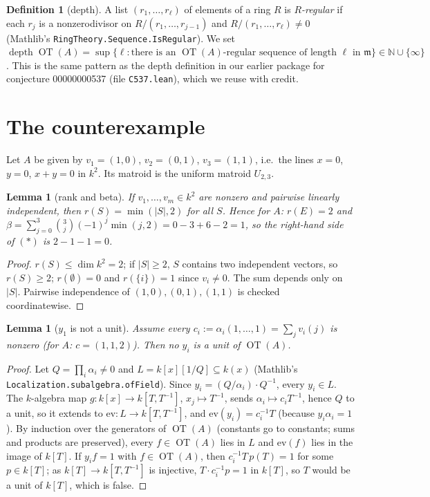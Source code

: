 \documentclass[11pt]{article}
\newtheorem{lemma}[theorem]{Lemma}
\theoremstyle{definition}
\newtheorem{definition}[theorem]{Definition}
\theoremstyle{remark}
\newcommand{\OT}{\operatorname{OT}}
\newcommand{\rk}{r}
\newcommand{\depth}{\operatorname{depth}}
\begin{document}
\begin{definition}[depth]
A list $(r_1,\dots,r_\ell)$ of elements of a ring $R$ is \emph{$R$-regular} if each $r_j$ is a
nonzerodivisor on $R/(r_1,\dots,r_{j-1})$ and $R/(r_1,\dots,r_\ell)\neq 0$ (Mathlib's
\texttt{RingTheory.Sequence.IsRegular}). We set
$\depth \OT(A)=\sup\{\ell : \text{there is an } \OT(A)\text{-regular sequence of length } \ell
\text{ in } \mathfrak{m}\}\in\mathbb{N}\cup\{\infty\}$. This is the same pattern as the depth
definition in our earlier package for conjecture 00000000537 (file \texttt{C537.lean}), which we
reuse with credit.
\end{definition}

\section{The counterexample}

Let $A$ be given by $v_1=(1,0)$, $v_2=(0,1)$, $v_3=(1,1)$, i.e.\ the lines $x=0$, $y=0$, $x+y=0$
in $k^2$. Its matroid is the uniform matroid $U_{2,3}$.

\begin{lemma}[rank and beta]\label{lem:rk}
If $v_1,\dots,v_m\in k^2$ are nonzero and pairwise linearly independent, then
$\rk(S)=\min(|S|,2)$ for all $S$. Hence for $A$: $\rk(E)=2$ and
$\beta=\sum_{j=0}^{3}\binom{3}{j}(-1)^j\min(j,2)=0-3+6-2=1$, so the right-hand side of
$(\ast)$ is $2-1-1=0$.
\end{lemma}

\begin{proof}
$\rk(S)\le\dim k^2=2$; if $|S|\ge 2$, $S$ contains two independent vectors, so $\rk(S)\ge 2$;
$\rk(\emptyset)=0$ and $\rk(\{i\})=1$ since $v_i\neq 0$. The sum depends only on $|S|$.
Pairwise independence of $(1,0),(0,1),(1,1)$ is checked coordinatewise.
\end{proof}

\begin{lemma}[$y_1$ is not a unit]\label{lem:unit}
Assume every $c_i:=\alpha_i(1,\dots,1)=\sum_j v_i(j)$ is nonzero (for $A$: $c=(1,1,2)$). Then no
$y_i$ is a unit of $\OT(A)$.
\end{lemma}

\begin{proof}
Let $Q=\prod_i\alpha_i\neq 0$ and $L=k[x][1/Q]\subseteq k(x)$ (Mathlib's
\texttt{Localization.subalgebra.ofField}). Since $y_i=(Q/\alpha_i)\cdot Q^{-1}$, every $y_i\in L$.
The $k$-algebra map $g:k[x]\to k[T,T^{-1}]$, $x_j\mapsto T^{-1}$, sends $\alpha_i\mapsto
c_iT^{-1}$, hence $Q$ to a unit, so it extends to $\mathrm{ev}:L\to k[T,T^{-1}]$, and
$\mathrm{ev}(y_i)=c_i^{-1}T$ (because $y_i\alpha_i=1$). By induction over the generators of
$\OT(A)$ (constants go to constants; sums and products are preserved), every $f\in\OT(A)$ lies
in $L$ and $\mathrm{ev}(f)$ lies in the image of $k[T]$. If $y_if=1$ with $f\in\OT(A)$, then
$c_i^{-1}T\,p(T)=1$ for some $p\in k[T]$; as $k[T]\to k[T,T^{-1}]$ is injective,
$T\cdot c_i^{-1}p=1$ in $k[T]$, so $T$ would be a unit of $k[T]$, which is false.
\end{proof}
\end{document}
